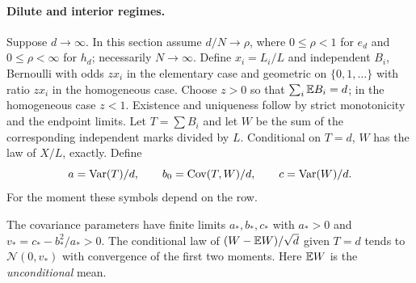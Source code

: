 \documentclass[11pt]{article}
\begin{document}
\paragraph{Dilute and interior regimes.} Suppose $d\to\infty$. In this section assume $d/N\to\rho$, where $0\le\rho<1$ for $e_d$ and $0\le\rho<\infty$ for $h_d$; necessarily $N\to\infty$. Define $x_i=L_i/L$ and independent $B_i$, Bernoulli with odds $z x_i$ in the elementary case and geometric on $\{0,1,\ldots\}$ with ratio $z x_i$ in the homogeneous case. Choose $z>0$ so that $\sum_i\mathbb E B_i=d$; in the homogeneous case $z<1$. Existence and uniqueness follow by strict monotonicity and the endpoint limits. Let $T=\sum B_i$ and let $W$ be the sum of the corresponding independent marks divided by $L$. Conditional on $T=d$, $W$ has the law of $X/L$, exactly. Define
\[
a=\operatorname{Var}(T)/d,\qquad b_0=\operatorname{Cov}(T,W)/d,\qquad c=\operatorname{Var}(W)/d .
\]
For the moment these symbols depend on the row.
\begin{lem}\label{tilt}The covariance parameters have finite limits $a_*,b_*,c_*$ with $a_*>0$ and $v_*=c_*-b_*^2/a_*>0$. The conditional law of $(W-\mathbb E W)/\sqrt d$ given $T=d$ tends to $\mathcal N(0,v_*)$ with convergence of the first two moments. Here $\mathbb E W$ is the \emph{unconditional} mean.\end{lem}
\end{document}

